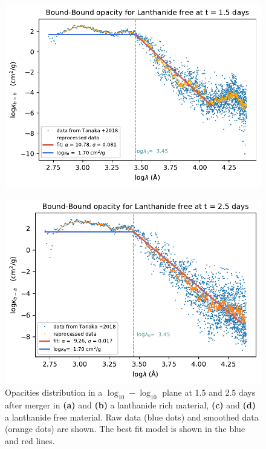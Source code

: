 \documentclass[a4paper, twoside, 11pt]{article}
\numberwithin{equation}{section}
\begin{document}
\begin{figure}[!h]
\begin{minipage}[t]{0.5\textwidth}
        	\includegraphics[scale=0.7]{pictures/LF/fit_LF_15d.pdf}\\%
        	\subcaption{}
    \end{minipage}
    \begin{minipage}[t]{0.5\textwidth}
      \advance\leftskip-0.2cm
        \includegraphics[scale=0.7]{pictures/LF/fit_LF_25d.pdf}
        \subcaption{}
    \end{minipage}
\caption[Opacities fitted with a ramp model]{Opacities distribution in a $\log_{10}-\log_{10}$ plane at 1.5 and 2.5 days after merger in 
\textbf{(a)} and  \textbf{(b)} a lanthanide rich material, 
\textbf{(c)} and \textbf{(d)}  a lanthanide free material.
Raw data (blue dots) and smoothed data (orange dots) are shown. The best fit model is shown in the blue and red lines. }
 \label{fig:RampModel}
\end{figure}
\end{document}
